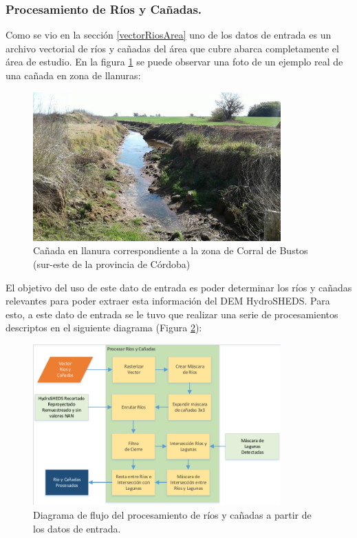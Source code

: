 \documentclass[10pt,a4paper, twoside]{report}
\begin{document}
\subsubsection{Procesamiento de Ríos y Cañadas.}

Como se vio en la sección \ref{vectorRiosArea} uno de los datos de entrada es un archivo vectorial de ríos y cañadas del área que cubre abarca completamente el área de estudio. En la figura \ref{caniada} se puede observar una foto de un ejemplo real de una cañada en zona de llanuras:

\begin{figure}[H]
   \centering      
   \includegraphics[width=0.85\textwidth]{imagenes/caniada.jpg}
 \caption{Cañada en llanura correspondiente a la zona de Corral de Bustos (sur-este de la provincia de Córdoba)}
 \label{caniada}
\end{figure}

El objetivo del uso de este dato de entrada es poder determinar los ríos y cañadas relevantes para poder extraer esta información del DEM HydroSHEDS. Para esto, a este dato de entrada se le tuvo que realizar una serie de procesamientos descriptos en el siguiente diagrama (Figura \ref{DiagramaRios}):

\begin{figure}[H]
   \centering      
   \includegraphics[width=0.85\textwidth]{imagenes/DiagramaRios.pdf}
 \caption{Diagrama de flujo del procesamiento de ríos y cañadas a partir de los datos de entrada.}
 \label{DiagramaRios}
\end{figure}	
\end{document}
